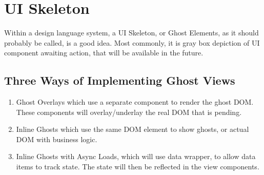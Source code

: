 \section{ UI Skeleton }
\maketitle{}

Within a design language system, a UI Skeleton, or Ghost Elements, as it should
probably be called, is a good idea. Most commonly, it is gray box depiction of
UI component awaiting action, that will be available in the future.

\subsection{ Three Ways of Implementing Ghost Views }
\begin{enumerate}
  \item Ghost Overlays which use a separate component to render the ghost DOM.
  These components will overlay/underlay the real DOM that is pending.
  \item Inline Ghosts which use the same DOM element to show ghosts, or actual
  DOM with business logic.
  \item Inline Ghosts with Async Loads, which will use data wrapper, to allow
  data items to track state. The state will then be reflected in the view
  components.
\end{enumerate}

